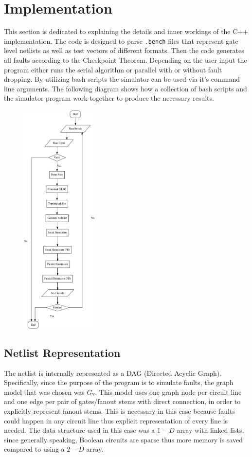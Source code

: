 \documentclass[a4paper,12pt]{article}
\begin{document}
\clearpage

\section*{Implementation}
This section is dedicated to explaining the details and inner workings of the C++ implementation. The code is designed to parse \texttt{.bench} files that represent gate level netlists as well as test vectors of different formats. Then the code generates all faults according to the Checkpoint Theorem. Depending on the user input the program either runs the serial algorithm or parallel with or without fault dropping. By utilizing bash scripts the simulator can be used via it's command line arguments. The following diagram shows how a collection of bash scripts and the simulator program work together to produce the necessary results.

\begin{figure}[h]  
  \centering
    \includegraphics[width=0.35\textwidth]{Diagram.png}
\end{figure}

\clearpage
\subsection*{Netlist Representation}
The netlist is internally represented as a DAG (Directed Acyclic Graph). Specifically, since the purpose of the program is to simulate faults, the graph model that was chosen was $G_2$. This model uses one graph node per circuit line and one edge per pair of gates/fanout stems with direct connection, in order to explicitly represent fanout stems. This is necessary in this case because faults could happen in any circuit line thus explicit representation of every line is needed. The data structure used in this case was a $1-D$ array with linked lists, since generally speaking, Boolean circuits are sparse thus more memory is saved compared to using a $2-D$ array. 
\end{document}
